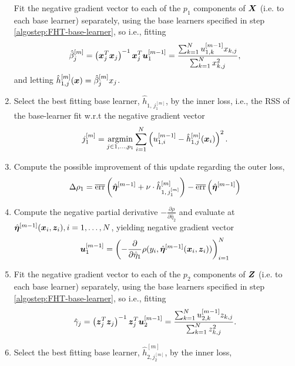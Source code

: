 \begin{algorithm}
\begin{enumerate}
        Fit the negative gradient vector to each of the $p_1$ components of $\bm{X}$ (i.e. to each base learner) separately, using the base learners specified in step \ref{algostep:FHT-base-learner}, so i.e., fitting
        \begin{equation*}
            \hat{\beta}_j^{[m]}=\left(\bm{x}_j^T\bm{x}_j\right)^{-1}\bm{x}_j^T \bm{u}^{[m-1]}_1=\frac{\sum_{k=1}^N u^{[m-1]}_{1,k}x_{k,j}}{\sum_{k=1}^N x_{k,j}^2},
        \end{equation*}
        and letting $\hat{h}_{1,j}^{[m]}(\bm{x})=\hat{\beta}_j^{[m]}x_j$.
    \item
        Select the best fitting base learner, $\hat{h}_{1,\,j_1^{[m]}}$, by the inner loss,
        i.e., the RSS of the base-learner fit w.r.t the negative gradient vector
        \begin{equation*}
            j_1^{[m]}=\operatorname*{argmin}_{j\in 1,\ldots,p_1}\sum_{i=1}^N\left(u_{1,i}^{[m-1]}-\hat{h}^{[m]}_{1,j}(\bm{x}_i)\right)^2.
        \end{equation*}
    \item
        Compute the possible improvement of this update regarding the outer loss,
        \begin{equation*}
            \Delta\rho_1=\overline{\text{err}}\left(\hat{\boldsymbol{\eta}}^{[m-1]} + \nu \cdot \hat{h}^{[m]}_{1,\,j_1^{[m]}} \right)-\overline{\text{err}}\left(\hat{\boldsymbol{\eta}}^{[m-1]} \right)
        \end{equation*}
    \item
        Compute the negative partial derivative $-\frac{\partial\rho}{\partial \hat{\eta}_2}$
        and evaluate at $\hat{\boldsymbol{\eta}}^{[m-1]}(\bm{x}_i,\bm{z}_i),i=1,\ldots,N$, yielding negative gradient vector
        \begin{equation*}
            \bm{u}^{[m-1]}_1=\left(-\frac{\partial}{\partial \hat{\eta}_1}\rho(y_i, \hat{\boldsymbol{\eta}}^{[m-1]}(\bm{x}_i,\bm{z}_i))\right)_{i=1}^N
        \end{equation*}
    \item
        Fit the negative gradient vector to each of the $p_2$ components of $\bm{Z}$ (i.e. to each base learner) separately, using the base learners specified in step \ref{algostep:FHT-base-learner}, so i.e., fitting
        \begin{equation*}
            \hat{\gamma}_j=\left(\bm{z}_j^T\bm{z}_j\right)^{-1}\bm{z}_j^T \bm{u}^{[m-1]}_2=\frac{\sum_{k=1}^N u^{[m-1]}_{2,k}z_{k,j}}{\sum_{k=1}^N z_{k,j}^2}.
        \end{equation*}
    \item
        Select the best fitting base learner, $\hat{h}^{[m]}_{2,j_2^{[m]}}$, by the inner loss,

\end{enumerate}
\end{algorithm}
